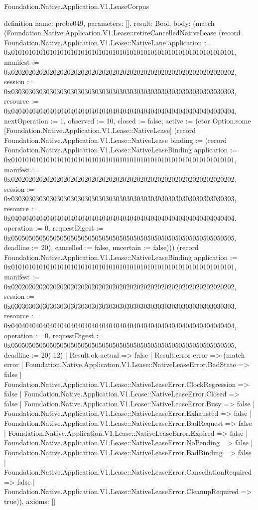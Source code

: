 \begin{lexlean}{Foundation.Native.Application.V1.LeaseCorpus}
\begin{semanticmodule}
definition{
  name: probe049,
  parameters: [],
  result: Bool,
  body: (match (Foundation.Native.Application.V1.Lease::retireCancelledNativeLease (record Foundation.Native.Application.V1.Lease::NativeLane {application := 0x0101010101010101010101010101010101010101010101010101010101010101, manifest := 0x0202020202020202020202020202020202020202020202020202020202020202, session := 0x0303030303030303030303030303030303030303030303030303030303030303, resource := 0x0404040404040404040404040404040404040404040404040404040404040404, nextOperation := 1, observed := 10, closed := false, active := (ctor Option.some [Foundation.Native.Application.V1.Lease::NativeLease] (record Foundation.Native.Application.V1.Lease::NativeLease {binding := (record Foundation.Native.Application.V1.Lease::NativeLeaseBinding {application := 0x0101010101010101010101010101010101010101010101010101010101010101, manifest := 0x0202020202020202020202020202020202020202020202020202020202020202, session := 0x0303030303030303030303030303030303030303030303030303030303030303, resource := 0x0404040404040404040404040404040404040404040404040404040404040404, operation := 0, requestDigest := 0x0505050505050505050505050505050505050505050505050505050505050505, deadline := 20}), cancelled := false, uncertain := false}))}) (record Foundation.Native.Application.V1.Lease::NativeLeaseBinding {application := 0x0101010101010101010101010101010101010101010101010101010101010101, manifest := 0x0202020202020202020202020202020202020202020202020202020202020202, session := 0x0303030303030303030303030303030303030303030303030303030303030303, resource := 0x0404040404040404040404040404040404040404040404040404040404040404, operation := 0, requestDigest := 0x0505050505050505050505050505050505050505050505050505050505050505, deadline := 20}) 12)
    | Result.ok actual => false
    | Result.error error => (match error
      | Foundation.Native.Application.V1.Lease::NativeLeaseError.BadState => false
      | Foundation.Native.Application.V1.Lease::NativeLeaseError.ClockRegression => false
      | Foundation.Native.Application.V1.Lease::NativeLeaseError.Closed => false
      | Foundation.Native.Application.V1.Lease::NativeLeaseError.Busy => false
      | Foundation.Native.Application.V1.Lease::NativeLeaseError.Exhausted => false
      | Foundation.Native.Application.V1.Lease::NativeLeaseError.BadRequest => false
      | Foundation.Native.Application.V1.Lease::NativeLeaseError.Expired => false
      | Foundation.Native.Application.V1.Lease::NativeLeaseError.NoPending => false
      | Foundation.Native.Application.V1.Lease::NativeLeaseError.BadBinding => false
      | Foundation.Native.Application.V1.Lease::NativeLeaseError.CancellationRequired => false
      | Foundation.Native.Application.V1.Lease::NativeLeaseError.CleanupRequired => true)),
  axioms: []
}


\end{semanticmodule}
\end{lexlean}
